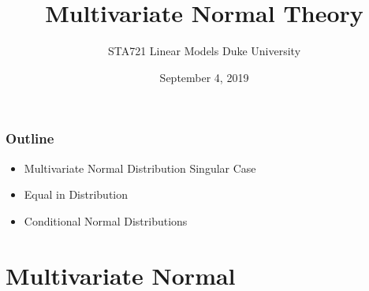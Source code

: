 \documentclass{beamer}
\title{Multivariate Normal Theory}
\institute{Merlise Clyde}
\author{STA721 Linear Models Duke University}
\date{September 4, 2019}
\begin{document}
\maketitle

\begin{frame} \frametitle{Outline}

  \begin{itemize}

  \item Multivariate Normal Distribution Singular Case
  \item Equal in Distribution
  \item Conditional Normal Distributions

  \end{itemize}
\end{frame}


\section{Multivariate Normal}
\end{document}
